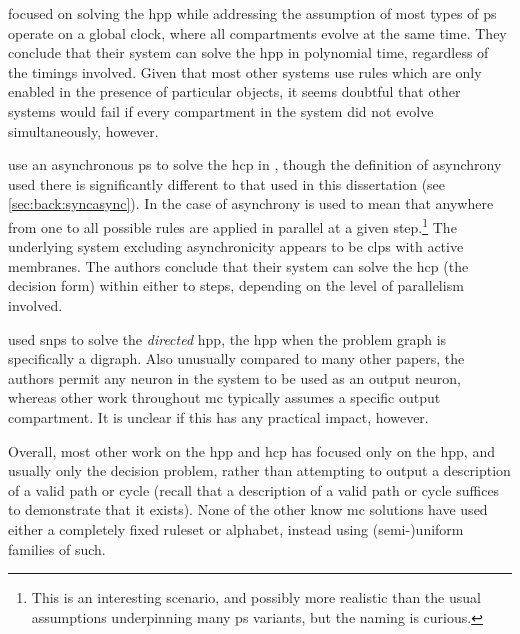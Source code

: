 
\citeauthor{Song2013} focused on solving the \gls{hpp} while addressing the assumption of most types of \gls{ps} operate on a global clock, where all compartments evolve at the same time.  They conclude that their system can solve the \gls{hpp} in polynomial time, regardless of the timings involved.  Given that most other systems use rules which are only enabled in the presence of particular objects, it seems doubtful that other systems would fail if every compartment in the system did not evolve simultaneously, however.


\citeauthor{Tagawa2012} use an asynchronous \gls{ps} to solve the \gls{hcp} in \cite{Tagawa2012}, though the definition of asynchrony used there is significantly different to that used in this dissertation (see \vref{sec:back:syncasync}).  In the case of \cite{Tagawa2012} asynchrony is used to mean that anywhere from one to all possible rules are applied in parallel at a given step.\footnote{This is an interesting scenario, and possibly more realistic than the usual assumptions underpinning many \gls{ps} variants, but the naming is curious.}  The underlying system excluding asynchronicity appears to be \gls{clps} with active membranes.  The authors conclude that their system can solve the \gls{hcp} (the decision form) within either  to  steps, depending on the level of parallelism involved.


\citeauthor{Xue2013} used \gls{snps} to solve the \emph{directed} \gls{hpp}, \ie{} the \gls{hpp} when the problem graph is specifically a digraph.  Also unusually compared to many other papers, the authors permit any neuron in the system to be used as an output neuron, whereas other work throughout \gls{mc} typically assumes a specific output compartment.  It is unclear if this has any practical impact, however.


Overall, most other work on the \gls{hpp} and \gls{hcp} has focused only on the \gls{hpp}, and usually only the decision problem, rather than attempting to output a description of a valid path or cycle (recall that a description of a valid path or cycle suffices to demonstrate that it exists).  None of the other know \gls{mc} solutions have used either a completely fixed \gls{ruleset} or alphabet, instead using (semi-)uniform families of such.

